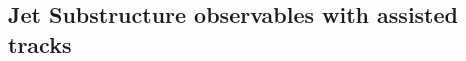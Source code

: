 \documentclass[UKenglish,texlive=2013]{\ATLASLATEXPATH atlasdoc}
\begin{document}






\subsection{Jet Substructure observables with assisted tracks}
\end{document}
